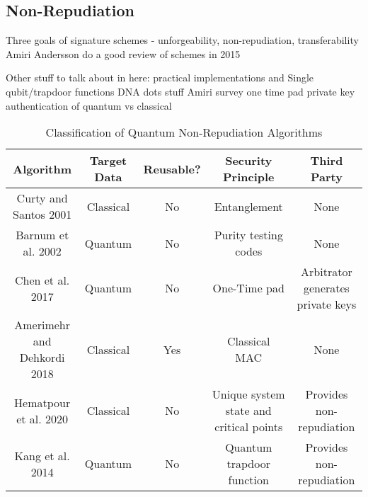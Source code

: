 \documentclass[sigconf]{acmart}
\begin{document}
\subsection{Non-Repudiation}
Three goals of signature schemes - unforgeability, non-repudiation, transferability\cite{amiri_unconditionally_2015}
Amiri Andersson do a good review of schemes in 2015

Other stuff to talk about in here:
practical implementations \cite{an_practical_2019} and \cite{ding_280-km_2020}
Single qubit/trapdoor functions \cite{kang_quantum_2015}
DNA dots stuff \cite{hematpour_presence_2020}
Amiri survey \cite{amiri_unconditionally_2015}
one time pad private key \cite{chen_public-key_2018}
authentication of quantum \cite{barnum_authentication_2002} vs classical \cite{curty_quantum_2001}


\begin{table*}[ht]
\caption{Classification of Quantum Non-Repudiation Algorithms}
\label{tab:nonrep}
\begin{tabular}{ |c|c|c|c|c| }
\hline
\textbf{Algorithm} & \textbf{Target Data} & \textbf{Reusable?} & \textbf{Security Principle} & \textbf{Third Party} \\ 
\hline
Curty and Santos 2001 & Classical & No & Entanglement & None \\
\hline
Barnum et al. 2002 & Quantum & No & Purity testing codes & None \\
\hline
Chen et al. 2017 & Quantum & No & One-Time pad & Arbitrator generates private keys \\
\hline
Amerimehr and Dehkordi 2018 & Classical & Yes & Classical MAC & None \\
\hline
Hematpour et al. 2020 & Classical & No & Unique system state and critical points & Provides non-repudiation \\
\hline
Kang et al. 2014 & Quantum & No & Quantum trapdoor function & Provides non-repudiation \\
\hline
\end{tabular}
\end{table*}
\end{document}

